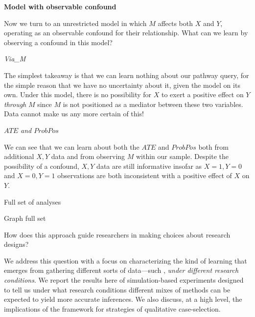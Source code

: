 \documentclass[
  12pt,
]{book}
\newenvironment{Shaded}{\begin{snugshade}}{\end{snugshade}}
\newcommand{\FloatTok}[1]{\textcolor[rgb]{0.00,0.00,0.81}{#1}}
\newcommand{\KeywordTok}[1]{\textcolor[rgb]{0.13,0.29,0.53}{\textbf{#1}}}
\newcommand{\NormalTok}[1]{#1}
\newcommand{\OperatorTok}[1]{\textcolor[rgb]{0.81,0.36,0.00}{\textbf{#1}}}
\newcommand{\StringTok}[1]{\textcolor[rgb]{0.31,0.60,0.02}{#1}}
\begin{document}
\textbf{Model with observable confound}

Now we turn to an unrestricted model in which \(M\) affects both \(X\) and \(Y\), operating as an observable confound for their relationship. What can we learn by observing a confound in this model?

\emph{Via\_M}

The simplest takeaway is that we can learn nothing about our pathway query, for the simple reason that we have no uncertainty about it, given the model on its own. Under this model, there is no possibility for \(X\) to exert a positive effect on \(Y\) \emph{through} \(M\) since \(M\) is not positioned as a mediator between these two variables. Data cannot make us any more certain of this!

\emph{\(ATE\) and \(ProbPos\)}

We can see that we can learn about both the \(ATE\) and \(ProbPos\) both from additional \(X, Y\) data and from observing \(M\) within our sample. Despite the possibility of a confound, \(X,Y\) data are still informative insofar as \(X=1, Y=0\) and \(X=0, Y=1\) observations are both inconsistent with a positive effect of \(X\) on \(Y\).

Full set of analyses

Graph full set

How does this approach guide researchers in making choices about research designs?

We address this question with a focus on characterizing the kind of learning that emerges from gathering different sorts of data---such , \emph{under different research conditions}. We report the results here of simulation-based experiments designed to tell us under what research conditions different mixes of methods can be expected to yield more accurate inferences. We also discuss, at a high level, the implications of the framework for strategies of qualitative case-selection.

\begin{Shaded}
\end{Shaded}
\end{document}
